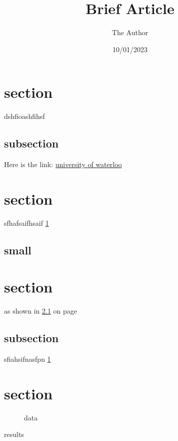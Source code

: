 \documentclass[11pt, oneside]{article}
\title{Brief Article}
\author{The Author}
\date{10/01/2023}							%
\begin{document}
\begin{appendix}
	\listoffigures
	\newpage
	\listoftables
\end{appendix}

\newpage

\tableofcontents
\newpage

\maketitle
 

\section{section}
\label{sec}
dshfioashfihsf


\subsection{subsection}
Here is the link:
\href{https://uwaterloo.ca/}{university of waterloo}


\section{section}
sfhafsaifhsaif \ref{sec}

\subsection{small}
\label{sm}


\section{section}
as shown in \ref{sm} on page \pageref{sm}

\subsection{subsection}
sfiahsifnasfpn
\ref{sec}
 
\section{section}

\begin{figure}
	\caption{data}  
\end{figure}
\begin{table}
	\caption{results} 
\end{table}
\end{document}
